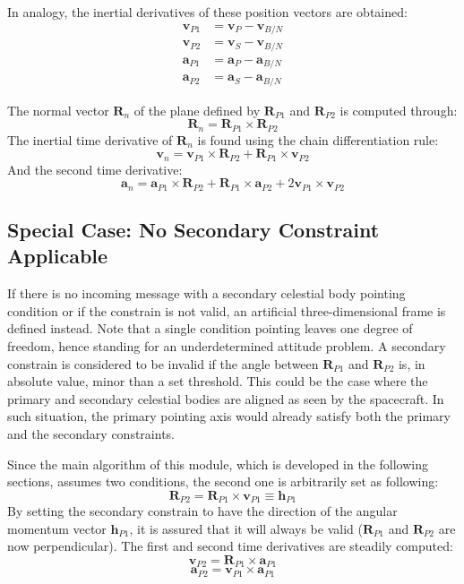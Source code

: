 \documentclass[]{AVSSimReportMemo}
\begin{document}
In analogy, the inertial derivatives of these position vectors are obtained:
\begin{subequations}
	\begin{align}
		 \bm{v}_{P1} &=\bm{v}_{P} - \bm{v}_{B/N} \\
		 \bm{v}_{P2} &=\bm{v}_{S} - \bm{v}_{B/N} \\
		 \bm{a}_{P1} &=\bm{a}_{P} - \bm{a}_{B/N} \\
		 \bm{a}_{P2} &=\bm{a}_{S} - \bm{a}_{B/N} 
	\end{align}
\end{subequations}

The normal vector $\bm{R}_{n}$ of the plane defined by $\bm{R}_{P1}$ and $\bm{R}_{P2}$ is computed through:
\begin{equation}
	\bm R_{n} =\bm{R}_{P1} \times \bm{R}_{P2}
\end{equation}
The inertial time derivative of $\bm{R}_n$ is found using the chain differentiation rule:
\begin{equation}
	\bm {v}_{n} = \bm{v}_{P1} \times \bm{R}_{P2} + \bm{R}_{P1} \times \bm{v}_{P2} 
\end{equation}
And the second time derivative:
\begin{equation}
	\bm {a}_{n} = \bm{a}_{P1} \times \bm{R}_{P2} + \bm{R}_{P1} \times \bm{a}_{P2}  + 2 \bm{v}_{P1} \times \bm{v}_{P2} 
\end{equation}
\subsection{ Special Case: No Secondary Constraint Applicable}
If there is no incoming message with a secondary celestial body pointing condition or if the constrain is not valid, an artificial three-dimensional frame is defined instead. Note that a single condition pointing leaves one degree of freedom, hence standing for an underdetermined attitude problem. A secondary constrain is considered to be invalid if the angle between $\bm{R}_{P1}$ and $\bm{R}_{P2}$ is, in absolute value, minor than a set threshold. This could be the case where the primary and secondary celestial bodies are aligned as seen by the spacecraft. In such situation, the primary pointing axis would already satisfy both the primary and the secondary constraints.

Since the main algorithm of this module, which is developed in the following sections, assumes two conditions, the second one is arbitrarily set as following:
\begin{equation}
		 \bm{R}_{P2} = \bm{R}_{P1} \times \bm{v}_{P1} \equiv  \bm{h}_{P1}
\end{equation}
By setting the secondary constrain to have the direction of the angular momentum vector $ \bm{h}_{P1}$, it is assured that it will always be valid ($\bm{R}_{P1}$ and $\bm{R}_{P2}$ are now perpendicular).
The first and second time derivatives are steadily computed:
\begin{equation}
	\bm{v}_{P2} =  \bm{R}_{P1} \times \bm{a}_{P1} 
\end{equation}
\begin{equation}
	\bm{a}_{P2} =  \bm{v}_{P1} \times \bm{a}_{P1} 
\end{equation}
\end{document}
